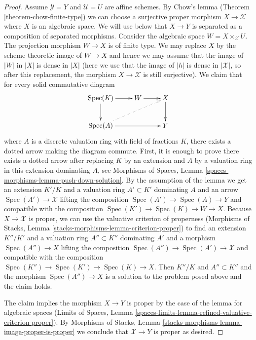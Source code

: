\documentclass[10pt,a4paper]{amsart}
\theoremstyle{plain}
\theoremstyle{definition}
\theoremstyle{remark}
\numberwithin{equation}{subsection}
\def\Spec{\mathop{\mathrm{Spec}}}
\begin{document}
\begin{proof}
\medskip\noindent
Assume $\mathcal{Y} = Y$ and $\mathcal{U} = U$ are affine schemes.
By Chow's lemma (Theorem \ref{theorem-chow-finite-type})
we can choose a surjective proper morphism $X \to \mathcal{X}$
where $X$ is an algebraic space. We will use below that $X \to Y$ is separated
as a composition of separated morphisms. Consider the
algebraic space $W = X \times_\mathcal{X} U$. The projection morphism
$W \to X$ is of finite type.
We may replace $X$ by the scheme theoretic image of
$W \to X$ and hence we may assume that the image of $|W|$ in $|X|$
is dense in $|X|$ (here we use that the image of $|h|$
is dense in $|\mathcal{X}|$, so after this replacement, the
morphism $X \to \mathcal{X}$ is still surjective).
We claim that for every solid commutative diagram
$$
\xymatrix{
\Spec(K) \ar[r] \ar[d] & W \ar[r] & X \ar[d] \\
\Spec(A) \ar[rr] \ar@{..>}[rru] & & Y
}
$$
where $A$ is a discrete valuation ring with field of fractions $K$, there
exists a dotted arrow making the diagram commute. First, it is enough to
prove there exists a dotted arrow after replacing $K$ by an extension
and $A$ by a valuation ring in this extension dominating $A$, see
Morphisms of Spaces, Lemma \ref{spaces-morphisms-lemma-push-down-solution}.
By the assumption of the lemma we get an extension $K'/K$ and a valuation
ring $A' \subset K'$ dominating $A$ and
an arrow $\Spec(A') \to \mathcal{X}$ lifting the composition
$\Spec(A') \to \Spec(A) \to Y$ and compatible with the composition
$\Spec(K') \to \Spec(K) \to W \to X$. Because $X \to \mathcal{X}$
is proper, we can use the valuative criterion of properness
(Morphisms of Stacks, Lemma \ref{stacks-morphisms-lemma-criterion-proper})
to find an extension $K''/K'$ and a valuation ring $A'' \subset K''$
dominating $A'$ and a morphism $\Spec(A'') \to X$ lifting the composition
$\Spec(A'') \to \Spec(A') \to \mathcal{X}$ and compatible with the composition
$\Spec(K'') \to \Spec(K') \to \Spec(K) \to X$.
Then $K''/K$ and $A'' \subset K''$ and the morphism $\Spec(A'') \to X$
is a solution to the problem posed above and the claim holds.

\medskip\noindent
The claim implies the morphism $X \to Y$ is proper by the
case of the lemma for algebraic spaces
(Limits of Spaces, Lemma
\ref{spaces-limits-lemma-refined-valuative-criterion-proper}).
By Morphisms of Stacks, Lemma
\ref{stacks-morphisms-lemma-image-proper-is-proper}
we conclude that $\mathcal{X} \to Y$ is proper as desired.
\end{proof}
\end{document}

